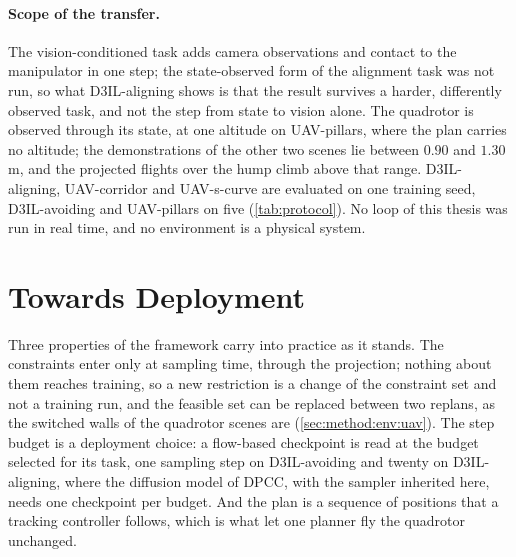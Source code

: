 \paragraph{Scope of the transfer.} The vision-conditioned task adds camera observations and contact to
the manipulator in one step; the state-observed form of the alignment task was not run, so what
D3IL-aligning shows is that the result survives a harder, differently observed task, and not the step
from state to vision alone. The quadrotor is observed through its state, at one altitude on UAV-pillars,
where the plan carries no altitude; the demonstrations of the other two scenes lie between $0.90$ and
$1.30$\,m, and the projected flights over the hump climb above that range.
D3IL-aligning, UAV-corridor and UAV-s-curve are evaluated on one training seed, D3IL-avoiding and
UAV-pillars on five (\autoref{tab:protocol}). No loop of this thesis was run in real time, and no environment is a physical system.

\section{Towards Deployment}\label{sec:disc:practice}

Three properties of the framework carry into practice as it stands. The constraints enter only at
sampling time, through the projection; nothing about them reaches training, so a new restriction is a
change of the constraint set and not a training run, and the feasible set can be replaced between two
replans, as the switched walls of the quadrotor scenes are (\autoref{sec:method:env:uav}). The step
budget is a deployment choice: a flow-based checkpoint is read at the budget selected for its task,
one sampling step on D3IL-avoiding and twenty on D3IL-aligning, where the diffusion model of
\ac{DPCC}, with the sampler inherited here, needs one checkpoint per budget.
And the plan is a sequence of positions that a tracking controller follows, which is what let one
planner fly the quadrotor unchanged.

